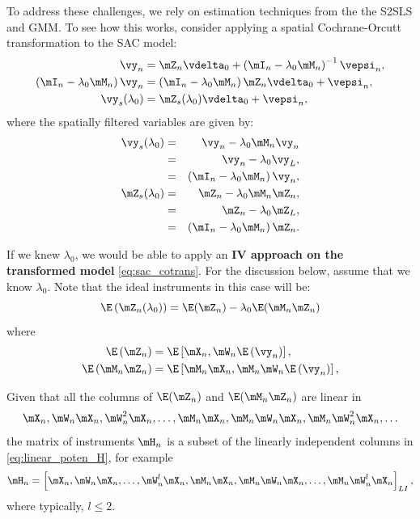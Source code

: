\documentclass[english,12pt]{book}\usepackage[]{graphicx}\usepackage[]{xcolor}
\begin{document}
To address these challenges, we rely on estimation techniques from the the S2SLS and GMM. To see how this works, consider applying a spatial Cochrane-Orcutt transformation to the SAC model: 
\begin{equation}\label{eq:sac_cotrans}
	\begin{aligned}
	\vy_n & = \mZ_n\vdelta_0 + \left(\mI_n - \lambda_0\mM_n\right)^{-1}\vepsi_n, \\
	\left(\mI_n - \lambda_0 \mM_n\right)\vy_n & = \left(\mI_n - \lambda_0 \mM_n\right) \mZ_n\vdelta_0 + \vepsi_n, \\
	\vy_s(\lambda_0) & = \mZ_s(\lambda_0)\vdelta_0 + \vepsi_n, 
	\end{aligned}
\end{equation}
%
where the spatially filtered variables are given by:
\begin{eqnarray*}
\vy_s(\lambda_0) & = & \vy_n - \lambda_0 \mM_n\vy_n \\
      & = & \vy_n - \lambda_0 \vy_L, \\
      & = & \left(\mI_n - \lambda_0 \mM_n\right)\vy_n, \\
\mZ_s(\lambda_0) & = & \mZ_n - \lambda_0 \mM_n \mZ_n, \\
      & = & \mZ_n - \lambda_0 \mZ_L, \\
      & = & \left(\mI_n - \lambda_0 \mM_n\right) \mZ_n. \\
\end{eqnarray*}

If we knew $\lambda_0$, we would be able to apply an \textbf{IV approach on the transformed model} \eqref{eq:sac_cotrans}. For the discussion below, assume that we know $\lambda_0$. Note that the ideal instruments in this case will be:
\begin{equation*}
\E\left(\mZ_n(\lambda_0)\right) = \E(\mZ_n) -\lambda_0\E(\mM_n\mZ_n)
\end{equation*}
%
where
\begin{equation*}
  \begin{aligned}
    \E\left(\mZ_n\right)    & = \E\left[\mX_n, \mW_n\E\left(\vy_n\right)\right], \\
    \E\left(\mM_n\mZ_n\right) & = \E\left[\mM_n\mX_n, \mM_n\mW_n\E\left(\vy_n\right)\right],
  \end{aligned}
\end{equation*}

Given that all the columns of $\E(\mZ_n)$ and $\E(\mM_n\mZ_n)$ are linear in
\begin{equation}\label{eq:linear_poten_H}
  \mX_n, \mW_n\mX_n, \mW^2_n\mX_n, \ldots, \mM_n\mX_n, \mM_n\mW_n\mX_n, \mM_n\mW^2_n\mX_n, \ldots
\end{equation}
%
the matrix of instruments $\mH_n$ is a subset of the linearly independent columns in \eqref{eq:linear_poten_H}, for example
\begin{equation*}
  \mH_n = \left[\mX_n, \mW_n\mX_n, \ldots, \mW^l_n\mX_n, \mM_n\mX_n, \mM_n\mW_n\mX_n, \ldots,\mM_n\mW^l_n\mX_n\right]_{LI},
\end{equation*}
%
where typically, $l\leq 2$. 
\end{document}
